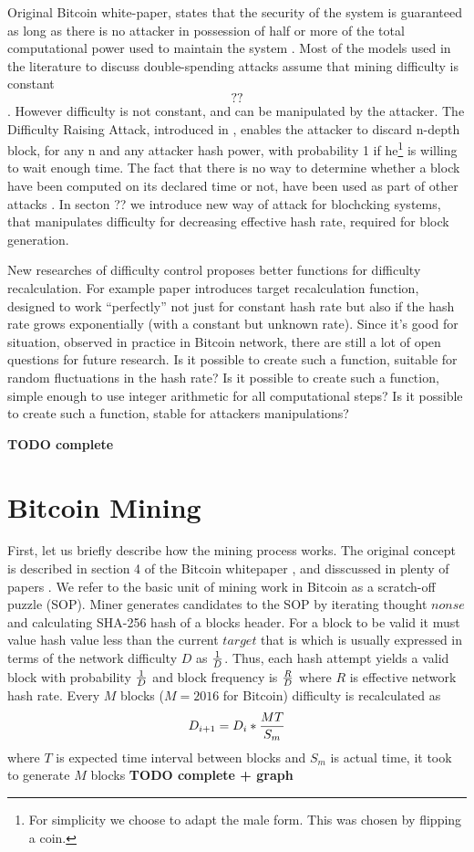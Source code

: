 \documentclass[number,preprint,review]{elsarticle}
\begin{document}
Original Bitcoin white-paper, states that the security of the system is guaranteed as long as there is no attacker in possession of half or more of the total computational power used to maintain the system \cite{Nakamoto2008}.
Most of the models used in the literature to discuss double-spending attacks assume that mining difficulty is constant \[??\].
However difficulty is not constant, and can be manipulated by the attacker.
The Difficulty Raising Attack, introduced in \cite{bahack2013theoretical}, enables the attacker to discard n-depth block, for any n and any attacker hash power, with probability 1 if he\footnote{For simplicity we choose to adapt the male form. This was chosen by flipping a coin.} is willing to wait enough time.
The fact that there is no way to determine whether a block have been computed on its declared time or not, have been used as part of other attacks \cite{timejacking2011, artforz2011}.
In secton ?? we introduce new way of attack for blochcking systems, that manipulates difficulty for decreasing effective hash rate, required for block generation.

New researches of difficulty control proposes better functions for difficulty recalculation.
For example paper \cite{kraft2015difficulty} introduces target recalculation function, designed to work “perfectly” not just for constant hash rate but also if the hash rate grows exponentially (with a constant but unknown rate).
Since it's good for situation, observed in practice in Bitcoin network, there are still a lot of open questions for future research.
Is it possible to create such a function, suitable for random fluctuations in the hash rate?
Is it possible to create such a function, simple enough to use integer arithmetic for all computational steps?
Is it possible to create such a function, stable for attackers manipulations?

 \textbf{TODO complete}

\section{Bitcoin Mining}

First, let us briefly describe how the mining process works.
The original concept is described in section 4 of the Bitcoin whitepaper \cite{Nakamoto2008}, and disscussed in plenty of papers \cite{kraft2015difficulty, miller2014permacoin, eyal2014majority}.
We refer to the basic unit of mining work in Bitcoin as a scratch-off puzzle (SOP).
Miner generates candidates to the SOP by iterating thought \(nonse\) and calculating SHA-256 hash of a blocks header.
For a block to be valid it must value hash value less than the current \(target\) that is which is usually expressed in terms of the network difficulty \(D\) as \(1\over D\).
Thus, each hash attempt yields a valid block with probability \(1\over D\) and block frequency is \(R\over D\) where \(R\) is effective network hash rate.
Every \(M\) blocks (\(M=2016\) for Bitcoin) difficulty is recalculated as
\begin{equation}
D_{i+1}=D_i*{MT\over S_m}
\end{equation}
where \(T\) is expected time interval between blocks and \(S_m\) is actual time, it took to generate \(M\) blocks
\textbf{TODO complete + graph}
\end{document}
